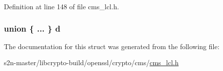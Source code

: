 Definition at line 148 of file cms\+\_\+lcl.\+h.

\subsubsection[{\texorpdfstring{d}{d}}]{\setlength{\rightskip}{0pt plus 5cm}union \{ ... \}   d}\hypertarget{struct_c_m_s___signer_identifier__st_a36a44b78601b1af2af47d5c6e2b1403e}{}\label{struct_c_m_s___signer_identifier__st_a36a44b78601b1af2af47d5c6e2b1403e}


The documentation for this struct was generated from the following file\+:\begin{DoxyCompactItemize}
\item 
s2n-\/master/libcrypto-\/build/openssl/crypto/cms/\hyperlink{cms__lcl_8h}{cms\+\_\+lcl.\+h}\end{DoxyCompactItemize}
